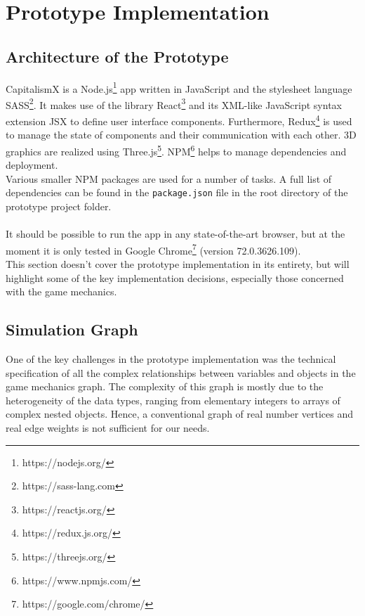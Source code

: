 \section{Prototype Implementation}
\subsection{Architecture of the Prototype}

CapitalismX is a Node.js\footnote{https://nodejs.org/} app written in JavaScript and the stylesheet language SASS\footnote{https://sass-lang.com}. It makes use of the library React\footnote{https://reactjs.org/} and its XML-like JavaScript syntax extension JSX to define user interface components. Furthermore, Redux\footnote{https://redux.js.org/} is used to manage the state of components and their communication with each other. 3D graphics are realized using Three.js\footnote{https://threejs.org/}. NPM\footnote{https://www.npmjs.com/} helps to manage dependencies and deployment.
\\
Various smaller NPM packages are used for a number of tasks. A full list of dependencies can be found in the \texttt{package.json} file in the root directory of the prototype project folder.\\\\
It should be possible to run the app in any state-of-the-art browser, but at the moment it is only tested in Google Chrome\footnote{https://google.com/chrome/} (version 72.0.3626.109).
\\
This section doesn't cover the prototype implementation in its entirety, but will highlight some of the key implementation decisions, especially those concerned with the game mechanics.

\subsection{Simulation Graph}

One of the key challenges in the prototype implementation was the technical specification of all the complex relationships between variables and objects in the game mechanics graph. The complexity of this graph is mostly due to the heterogeneity of the data types, ranging from elementary integers to arrays of complex nested objects. 
 Hence, a conventional graph of real number vertices and real edge weights is not sufficient for our needs.
 
